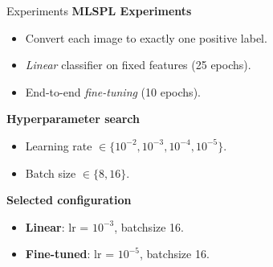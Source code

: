 \begin{frame}{Experiments}
\textbf{MLSPL Experiments}
\begin{itemize}
  \item Convert each image to exactly one positive label.
  \item \textit{Linear} classifier on fixed features (25 epochs).
  \item End-to-end \textit{fine-tuning} (10 epochs).
\end{itemize}
\textbf{Hyperparameter search}
\begin{itemize}
  \item Learning rate \(\in\{10^{-2},10^{-3},10^{-4},10^{-5}\}\).
  \item Batch size \(\in\{8,16\}\).
\end{itemize}
\textbf{Selected configuration}
\begin{itemize}
  \item \textbf{Linear}: lr = \(10^{-3}\), batchsize 16.
  \item \textbf{Fine-tuned}: lr = \(10^{-5}\), batchsize 16.
\end{itemize}
\end{frame}

